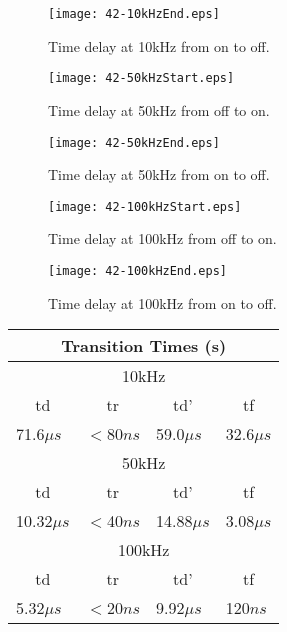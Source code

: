 \documentclass[%
 aip,
 jmp,
 amsmath,
 amssymb,
 reprint,%
 numerical,
 longbibliography,
]{revtex4-1}
\begin{document}
	\begin{figure}[H]
	\texttt{[image: 42-10kHzEnd.eps]}
	\caption{Time delay at 10kHz from on to off.}
	\end{figure}
	
	\begin{figure}[H]
	\texttt{[image: 42-50kHzStart.eps]}
	\caption{Time delay at 50kHz from off to on.}
	\end{figure}	
	
	\begin{figure}[H]
	\texttt{[image: 42-50kHzEnd.eps]}
	\caption{Time delay at 50kHz from on to off.}
	\end{figure}
	
	\begin{figure}[H]
	\texttt{[image: 42-100kHzStart.eps]}
	\caption{Time delay at 100kHz from off to on.}
	\end{figure}	
	
	\begin{figure}[H]
	\texttt{[image: 42-100kHzEnd.eps]}
	\caption{Time delay at 100kHz from on to off.}
	\end{figure}
	
	\begin{tabularx}{0.45\textwidth}[t]{| X | X | X | X |}
	\hline
	\multicolumn{4}{|c|}{Transition Times (s)}\\
	\hline
	\multicolumn{4}{|c|}{10kHz}\\
	\hline	
	\multicolumn{1}{|c|}{td} & \multicolumn{1}{c|}{tr} & \multicolumn{1}{c|}{td'} & \multicolumn{1}{c|}{tf}\\ \hline
	\hline
	71.6$\mu s$ & $<$80$ns$ & 59.0$\mu s$ & 32.6$\mu s$ \\ \hline
	\multicolumn{4}{|c|}{50kHz}\\
	\hline	
	\multicolumn{1}{|c|}{td} & \multicolumn{1}{c|}{tr} & \multicolumn{1}{c|}{td'} & \multicolumn{1}{c|}{tf}\\ \hline
	\hline
	10.32$\mu s$ & $<$40$ns$ & 14.88$\mu s$ & 3.08$\mu s$ \\ \hline
	\multicolumn{4}{|c|}{100kHz}\\
	\hline	
	\multicolumn{1}{|c|}{td} & \multicolumn{1}{c|}{tr} & 
	\multicolumn{1}{c|}{td'} & \multicolumn{1}{c|}{tf}\\ \hline
	\hline
	5.32$\mu s$ & $<$20$ns$ & 9.92$\mu s$ & 120$ns$ \\ \hline
	\end{tabularx}
	
\end{document}
